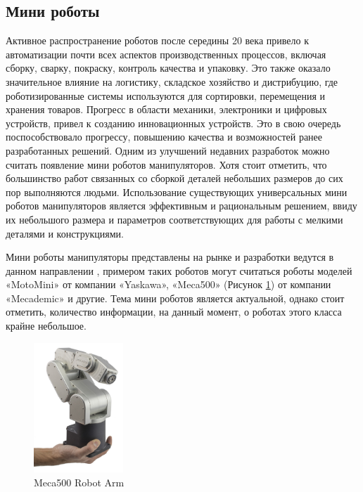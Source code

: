 \subsection{Мини роботы}

Активное распространение роботов после середины 20 века привело к автоматизации почти всех аспектов производственных процессов, включая сборку, сварку, покраску, контроль качества и упаковку. Это также оказало значительное влияние на логистику, складское хозяйство и дистрибуцию, где роботизированные системы используются для сортировки, перемещения и хранения товаров. Прогресс в области механики, электроники и цифровых устройств, привел к созданию инновационных устройств. Это в свою очередь поспособствовало прогрессу, повышению качества и возможностей ранее разработанных решений. Одним из улучшений недавних разработок можно считать появление мини роботов манипуляторов.
Хотя стоит отметить, что большинство работ связанных со сборкой деталей небольших размеров до сих пор выполняются людьми. Использование существующих универсальных мини роботов манипуляторов является эффективным и рациональным решением, ввиду их небольшого размера и параметров соответствующих для работы с мелкими деталями и конструкциями.

Мини роботы манипуляторы представлены на рынке и разработки ведутся в данном направлении \citep{Li2022}, примером таких роботов могут считаться роботы моделей «MotoMini» от компании «Yaskawa», «Meca500» (Рисунок \ref{meca}) от компании «Mecademic»  и другие. Тема мини роботов является актуальной, однако стоит отметить, количество информации, на данный момент, о роботах этого класса крайне небольшое.

\begin{figure}[H]
	\centering
	\includegraphics[width=0.3\textwidth]{Src/images/Meca500.jpg}
	\caption{Meca500 Robot Arm}
	\label{meca}
\end{figure}

